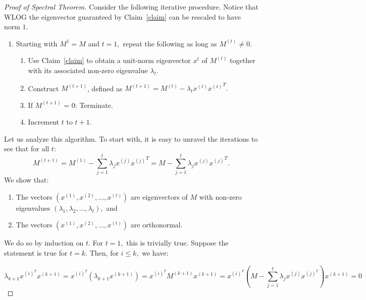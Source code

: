 \begin{proof}[Proof of Spectral Theorem]
Consider the following iterative procedure. Notice that WLOG the eigenvector guaranteed by Claim~\ref{claim} can be rescaled to have norm $1$.
\begin{enumerate}
\item Starting with $M^{1} = M$ and $t=1,$ repeat the following as long as $M^{(t)} \neq 0.$
	\begin{enumerate}
    \item Use Claim~\ref{claim} to obtain a unit-norm eigenvector $x^{t}$ of $M^{(t)}$ together with its associated non-zero eigenvalue $\lambda_t.$
    \item Construct $M^{(t+1)}$, defined as $M^{(t+1)} = M^{(t)} - \lambda_t x^{(t)} {x^{(t)}}^T.$
    \item If $M^{(t+1)}$ = 0: Terminate. 
    \item Increment $t$ to $t+1.$
	\end{enumerate}
\end{enumerate}
Let us analyze this algorithm. To start with, it is easy to unravel the iterations to see that for all $t$:
$$
M^{(t+1)} = M^{(1)} - \sum_{j=1}^t \lambda_j x^{(j)} {x^{(j)}}^T = M - \sum_{j=1}^t \lambda_j x^{(j)} {x^{(j)}}^T. 
$$
We show that:
\begin{enumerate}
\item The vectors $(x^{(1)}, x^{(2)}, \ldots, x^{(t)})$ are eigenvectors of $M$ with non-zero eigenvalues $(\lambda_1, \lambda_2, \ldots, \lambda_t),$ and
\item The vectors $(x^{(1)}, x^{(2)}, \ldots, x^{(t)})$ are orthonormal.
\end{enumerate}
We do so by induction on $t.$ For $t=1,$ this is trivially true. Suppose the statement is true for $t=k.$ Then, for $i \leq k,$ we have:

$$
\lambda_{k+1}x^{(i)^T} x^{(k+1)} = x^{(i)^T} \left(\lambda_{k+1}x^{(k+1)}\right) = x^{(i)^T}M^{(k+1)}x^{(k+1)} = x^{(i)^T} \left(M - \sum_{j=1}^t \lambda_j x^{(j)}x^{(j)^T}\right)x^{(k+1)} = 0
$$



\end{proof}
